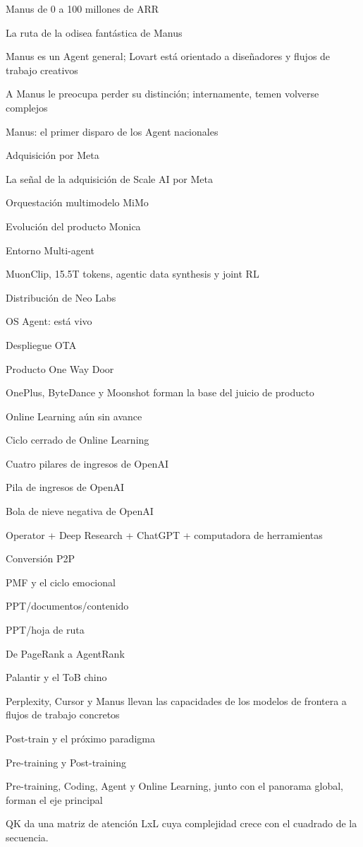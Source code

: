 \documentclass{article}
\begin{document}
Manus de 0 a 100 millones de ARR

La ruta de la odisea fantástica de Manus

Manus es un Agent general; Lovart está orientado a diseñadores y flujos de trabajo creativos

A Manus le preocupa perder su distinción; internamente, temen volverse complejos

Manus: el primer disparo de los Agent nacionales

Adquisición por Meta

La señal de la adquisición de Scale AI por Meta

Orquestación multimodelo MiMo

Evolución del producto Monica

Entorno Multi-agent

MuonClip, 15.5T tokens, agentic data synthesis y joint RL

Distribución de Neo Labs

OS Agent: está vivo

Despliegue OTA

Producto One Way Door

OnePlus, ByteDance y Moonshot forman la base del juicio de producto

Online Learning aún sin avance

Ciclo cerrado de Online Learning

Cuatro pilares de ingresos de OpenAI

Pila de ingresos de OpenAI

Bola de nieve negativa de OpenAI

Operator + Deep Research + ChatGPT + computadora de herramientas

Conversión P2P

PMF y el ciclo emocional

PPT/documentos/contenido

PPT/hoja de ruta

De PageRank a AgentRank

Palantir y el ToB chino

Perplexity, Cursor y Manus llevan las capacidades de los modelos de frontera a flujos de trabajo concretos

Post-train y el próximo paradigma

Pre-training y Post-training

Pre-training, Coding, Agent y Online Learning, junto con el panorama global, forman el eje principal

QK da una matriz de atención LxL cuya complejidad crece con el cuadrado de la secuencia.
\end{document}
